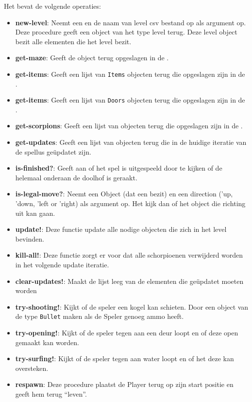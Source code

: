Het \texttt{} bevat de volgende operaties:
\begin{itemize}
	\item \textbf{new-level}: Neemt een \texttt{} en de naam van level csv bestand op als argument op.
		Deze procedure geeft een object van het type level terug.
		Deze level object bezit alle elementen die het level bezit.
	\item \textbf{get-maze}: Geeft de \texttt{} object terug opgeslagen in de \texttt{}.
	\item \textbf{get-items}: Geeft een lijst van \texttt{Items} objecten terug die opgeslagen zijn in de \texttt{}.
	\item \textbf{get-items}: Geeft een lijst van \texttt{Doors} objecten terug die opgeslagen zijn in de \texttt{}.
	\item \textbf{get-scorpions}: Geeft een lijst van \texttt{} objecten terug die opgeslagen zijn in de \texttt{}.
	\item \textbf{get-updates}: Geeft een lijst van objecten terug die in de huidige iteratie van de spellus geüpdatet zijn.
	\item \textbf{is-finished?}: Geeft aan of het spel is uitgespeeld door te kijken of de \texttt{} helemaal onderaan de doolhof is geraakt.
	\item \textbf{is-legal-move?}: Neemt een Object (dat een \texttt{} bezit) en een direction ('up, 'down, 'left or 'right) als argument op.
		Het kijk dan of het object die richting uit kan gaan.
	\item \textbf{update!}: Deze functie update alle nodige objecten die zich in het level bevinden.
	\item \textbf{kill-all!}: Deze functie zorgt er voor dat alle schorpioenen verwijderd worden in het volgende update iteratie.
	\item \textbf{clear-updates!}: Maakt de lijst leeg van de elementen die geüpdatet moeten worden
	\item \textbf{try-shooting!}: Kijkt of de speler een kogel kan schieten.
		Door een object van de type \texttt{Bullet} maken als de Speler genoeg ammo heeft.
	\item \textbf{try-opening!}: Kijkt of de speler tegen aan een deur loopt en of deze open gemaakt kan worden.
	\item \textbf{try-surfing!}: Kijkt of de speler tegen aan water loopt en of het deze kan oversteken.
	\item \textbf{respawn}: Deze procedure plaatst de Player terug op zijn start positie en geeft hem terug ``leven''.
\end{itemize}

